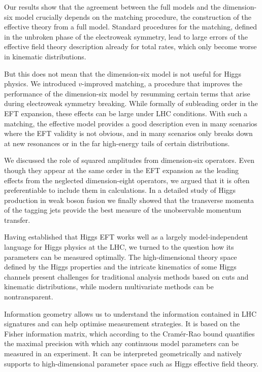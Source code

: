 Our results show that the agreement between the full models and the
dimension-six model crucially depends on the matching procedure, \ie
the construction of the effective theory from a full model. Standard
procedures for the matching, defined in the unbroken phase of the
electroweak symmetry, lead to large errors of the effective field
theory description already for total rates, which only become worse
in kinematic distributions.

But this does not mean that the dimension-six model is not useful for
Higgs physics. We introduced $v$-improved matching, a procedure that
improves the performance of the dimension-six model by resumming
certain terms that arise during electroweak symmetry breaking. While
formally of subleading order in the EFT expansion, these effects can
be large under LHC conditions. With such a matching, the effective
model provides a good description even in many scenarios where the EFT
validity is not obvious, and in many scenarios only breaks down at new
resonances or in the far high-energy tails of certain distributions.

We discussed the role of squared amplitudes from dimension-six
operators. Even though they appear at the same order in the EFT
expansion as the leading effects from the neglected dimension-eight
operators, we argued that it is often preferentiable to include them
in calculations. In a detailed study of Higgs production in weak boson
fusion we finally showed that the transverse momenta of the tagging
jets provide the best measure of the unobservable momentum transfer.

\newparagraph
%
Having established that Higgs EFT works well as a largely
model-independent language for Higgs physics at the LHC, we turned to
the question how its parameters can be measured optimally. The
high-dimensional theory space defined by the Higgs properties and the
intricate kinematics of some Higgs channels present challenges for
traditional analysis methods based on cuts and kinematic
distributions, while modern multivariate methods can be nontransparent.

Information geometry allows us to understand the information contained
in LHC signatures and can help optimise measurement strategies. It is
based on the Fisher information matrix, which according to the
Cram\'er-Rao bound quantifies the maximal precision with which any
continuous model parameters can be measured in an experiment. It can be
interpreted geometrically and natively supports to high-dimensional
parameter space such as Higgs effective field theory.

